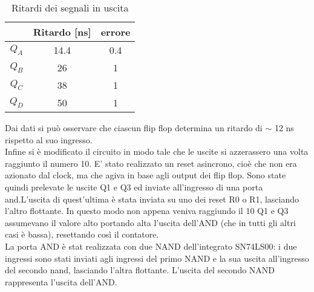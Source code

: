 \begin{table}[h]
	\centering
	\begin{tabular}{ccc }
		
		 & Ritardo [ns]& errore\\
		 \midrule 
		  $Q_{A}$ & 14.4 & 0.4 \\
		  $Q_{B}$ & 26 & 1 \\
		  $Q_{C}$ & 38 & 1 \\
          $Q_{D}$ & 50 & 1 \\
 	\end{tabular}
	\caption{ Ritardi dei segnali in uscita }
	\label{t:Ritardi}
\end{table}
Dai dati si può osservare che ciascun flip flop determina un ritardo di $\sim$ 12 ns rispetto al suo ingresso.\\
Infine si è modificato il circuito in modo tale che le uscite si azzerassero una volta raggiunto il numero 10. E' stato realizzato un reset asincrono, cioè che non era azionato dal clock, ma che agiva in base agli output dei flip flop. Sono state quindi prelevate le uscite Q1 e Q3 ed inviate all'ingresso di una porta and.L'uscita di quest'ultima è stata inviata su uno dei reset R0 o R1, lasciando l'altro flottante. In questo modo non appena veniva raggiundo il 10 Q1 e Q3 assumevano il valore alto portando alta l'uscita dell'AND (che in tutti gli altri casi è bassa), resettando così il contatore.\\
La porta AND è stat realizzata con due NAND dell'integrato SN74LS00: i due ingressi sono stati inviati agli ingressi del primo NAND e la sua uscita all'ingresso del secondo nand, lasciando l'altra flottante. L'uscita del secondo NAND rappresenta l'uscita dell'AND.
